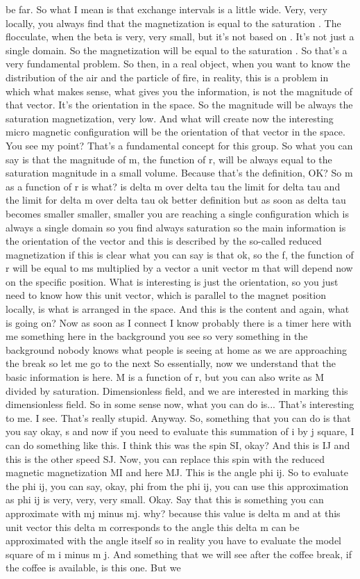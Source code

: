 be far. So what I mean is that exchange intervals is a little wide. Very, very locally, you always find that the magnetization is equal to the saturation . The flocculate, when the beta is very, very small, but it's not based on . It's not just a single domain. So the magnetization will be equal to the saturation . So that's a very fundamental problem. So then, in a real object, when you want to know the distribution of the air and the particle of fire, in reality, this is a problem in which what makes sense, what gives you the information, is not the magnitude of that vector. It's the orientation in the space. So the magnitude will be always the saturation magnetization, very low. And what will create now the interesting micro magnetic configuration will be the orientation of that vector in the space. You see my point? That's a fundamental concept for this group. So what you can say is that the magnitude of m, the function of r, will be always equal to the saturation magnitude in a small volume. Because that's the definition, OK? So m as a function of r is what? is delta m over delta tau the limit for delta tau and the limit for delta m over delta tau ok better definition but as soon as delta tau becomes smaller smaller, smaller you are reaching a single configuration which is always a single domain so you find always saturation so the main information is the orientation of the vector and this is described by the so-called reduced magnetization if this is clear what you can say is that ok, so the f, the function of r will be equal to ms multiplied by a vector a unit vector m that will depend now on the specific position. What is interesting is just the orientation, so you just need to know how this unit vector, which is parallel to the magnet position locally, is what is arranged in the space. And this is the content and again, what is going on? Now as soon as I connect I know probably there is a timer here with me something here in the background you see so very something in the background nobody knows what people is seeing at home as we are approaching the break so let me go to the next So essentially, now we understand that the basic information is here. M is a function of r, but you can also write as M divided by saturation. Dimensionless field, and we are interested in marking this dimensionless field. So in some sense now, what you can do is... That's interesting to me. I see. That's really stupid. Anyway. So, something that you can do is that you say okay, s and now if you need to evaluate this summation of i by j square, I can do something like this. I think this was the spin SI, okay? And this is IJ and this is the other speed SJ. Now, you can replace this spin with the reduced magnetic magnetization MI and here MJ. This is the angle phi ij. So to evaluate the phi ij, you can say, okay, phi from the phi ij, you can use this approximation as phi ij is very, very, very small. Okay. Say that this is something you can approximate with mj minus mj. why? because this value is delta m and at this unit vector this delta m corresponds to the angle this delta m can be approximated with the angle itself so in reality you have to evaluate the model square of m i minus m j. And something that we will see after the coffee break, if the coffee is available, is this one. But we 